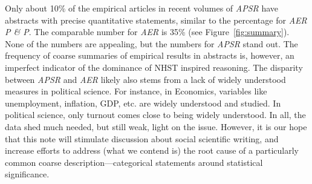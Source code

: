 \documentclass[12pt]{article}
\begin{document}
Only about 10\% of the empirical articles in recent volumes of \emph{APSR} have abstracts with precise quantitative statements, similar to the percentage for \emph{AER} \emph{P \& P}. The comparable number for \emph{AER} is 35\% (see Figure~\ref{fig:summary}). None of the numbers are appealing, but the numbers for \emph{APSR} stand out. The frequency of coarse summaries of empirical results in abstracts is, however, an imperfect indicator of the dominance of NHST inspired reasoning. The disparity between \emph{APSR} and \emph{AER} likely also stems from a lack of widely understood measures in political science. For instance, in Economics, variables like unemployment, inflation, GDP, etc. are widely understood and studied. In political science, only turnout comes close to being widely understood. In all, the data shed much needed, but still weak, light on the issue. However, it is our hope that this note will stimulate discussion about social scientific writing, and increase efforts to address (what we contend is) the root cause of a particularly common coarse description—categorical statements around statistical significance.

\clearpage


\end{document}
